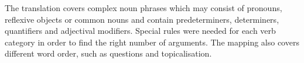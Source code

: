 \documentclass{report}
\begin{document}
The translation covers complex noun phrases which may consist of pronouns,
reflexive objects or common nouns and contain predeterminers, 
determiners, quantifiers and adjectival modifiers. Special rules were needed
for each verb category in order to find the right number of arguments.
The mapping also covers different word order, such as questions and topicalisation.



\end{document}
